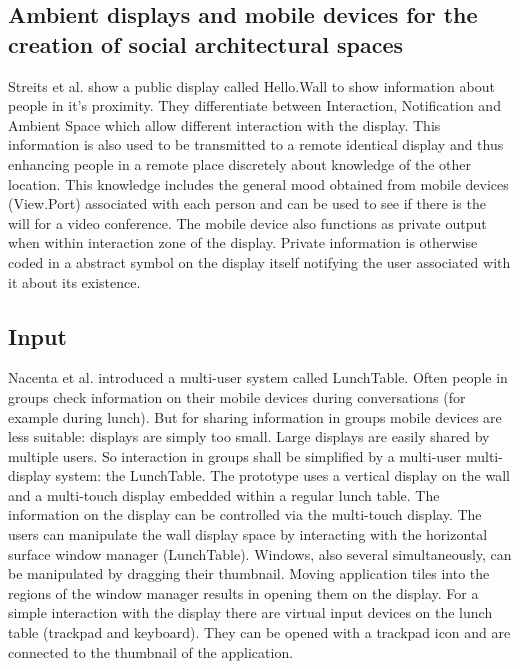 \subsection{Ambient displays and mobile devices for the creation of social architectural spaces}
Streits et al. \cite{streitz_ambient_2003} show a public display called Hello.Wall to show information about people in it's proximity.
They differentiate between Interaction, Notification and Ambient Space which allow different interaction with the display.
This information is also used to be transmitted to a remote identical display and thus enhancing people in a remote place discretely about knowledge of the other location.
This knowledge includes the general mood obtained from mobile devices (View.Port) associated with each person and can be used to see if there is the will for a video conference.
The mobile device also functions as private output when within interaction zone of the display.
Private information is otherwise coded in a abstract symbol on the display itself notifying the user associated with it about its existence.





\subsection{Input}
Nacenta et al. \cite{a18-nacenta} introduced a multi-user system called LunchTable.
Often people in groups check information on their mobile devices during conversations (for example during lunch). But for sharing information in groups mobile devices are less suitable: displays are simply too small.
Large displays are easily shared by multiple users. So interaction in groups shall be simplified by a multi-user multi-display system: the LunchTable.
The prototype uses a vertical display on the wall and a multi-touch display embedded within a regular lunch table.
The information on the display can be controlled via the multi-touch display.
The users can manipulate the wall display space by interacting with the horizontal surface window manager (LunchTable).
Windows, also several simultaneously, can be manipulated by dragging their thumbnail. Moving application tiles into the regions of the window manager results in opening them on the display.
For a simple interaction with the display there are virtual input devices on the lunch table (trackpad and keyboard).
They can be opened with a trackpad icon and are connected to the thumbnail of the application.


